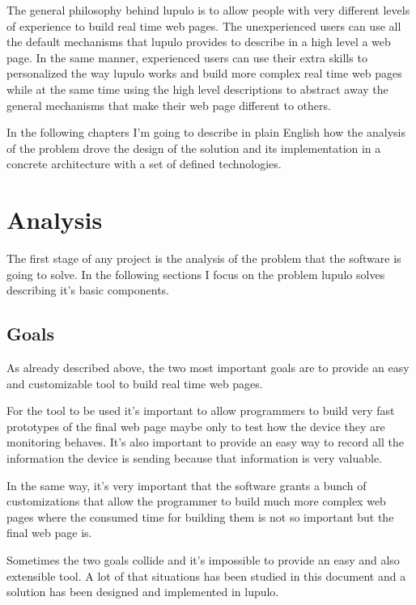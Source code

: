 \documentclass[12pt]{article}
\begin{document}
            The general philosophy behind lupulo is to allow people with very
            different levels of experience to build real time web pages. The
            unexperienced users can use all the default mechanisms that lupulo
            provides to describe in a high level a web page. In the same manner,
            experienced users can use their extra skills to personalized the way
            lupulo works and build more complex real time web pages while at the
            same time using the high level descriptions to abstract away the
            general mechanisms that make their web page different to others.

            In the following chapters I'm going to describe in plain English
            how the analysis of the problem drove the design of the solution and
            its implementation in a concrete architecture with a set of
            defined technologies.

    \section{Analysis}
        The first stage of any project is the analysis of the problem that the
        software is going to solve. In the following sections I focus on the
        problem lupulo solves describing it's basic components.

        \subsection{Goals}
            As already described above, the two most important goals are to
            provide an easy and customizable tool to build real time web pages.

            For the tool to be used it's important to allow programmers to build
            very fast prototypes of the final web page maybe only to test how
            the device they are monitoring behaves. It's also important to
            provide an easy way to record all the information the device is
            sending because that information is very valuable.

            In the same way, it's very important that the software grants a
            bunch of customizations that allow the programmer to build much more
            complex web pages where the consumed time for building them is not
            so important but the final web page is.

            Sometimes the two goals collide and it's impossible to provide an
            easy and also extensible tool. A lot of that situations has been
            studied in this document and a solution has been designed and
            implemented in lupulo.
\end{document}
